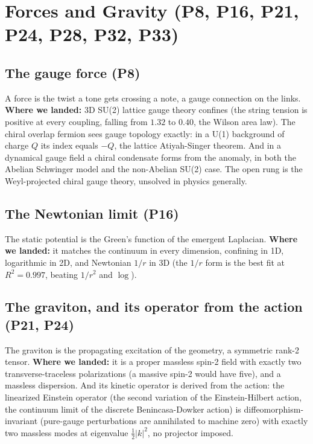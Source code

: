 \section{Forces and Gravity (P8, P16, P21, P24, P28, P32, P33)}
\label{sec:gravity}

\subsection{The gauge force (P8)}

A force is the twist a tone gets crossing a note, a gauge connection on the links.
\textbf{Where we landed:} 3D SU(2) lattice gauge theory confines (the string tension is
positive at every coupling, falling from $1.32$ to $0.40$, the Wilson area law). The
chiral overlap fermion sees gauge topology exactly: in a U(1) background of charge $Q$
its index equals $-Q$, the lattice Atiyah-Singer theorem. And in a dynamical gauge
field a chiral condensate forms from the anomaly, in both the Abelian Schwinger model
and the non-Abelian SU(2) case. The open rung is the Weyl-projected chiral gauge theory,
unsolved in physics generally.

\subsection{The Newtonian limit (P16)}

The static potential is the Green's function of the emergent Laplacian. \textbf{Where we
landed:} it matches the continuum in every dimension, confining in 1D, logarithmic in
2D, and Newtonian $1/r$ in 3D (the $1/r$ form is the best fit at $R^2 = 0.997$, beating
$1/r^2$ and $\log$).

\subsection{The graviton, and its operator from the action (P21, P24)}

The graviton is the propagating excitation of the geometry, a symmetric rank-2 tensor.
\textbf{Where we landed:} it is a proper massless spin-2 field with exactly two
transverse-traceless polarizations (a massive spin-2 would have five), and a massless
dispersion. And its kinetic operator is derived from the action: the linearized Einstein
operator (the second variation of the Einstein-Hilbert action, the continuum limit of
the discrete Benincasa-Dowker action) is diffeomorphism-invariant (pure-gauge
perturbations are annihilated to machine zero) with exactly two massless modes at
eigenvalue $\tfrac12|k|^2$, no projector imposed.

